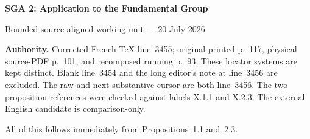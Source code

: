 \documentclass[10pt,a4paper]{article}
\begin{document}
\begin{center}
  {\Large\bfseries SGA 2: Application to the Fundamental Group}\par\smallskip
  {\large Bounded source-aligned working unit --- 20 July 2026}
\end{center}

\noindent\colorbox{softgray}{\parbox{0.95\linewidth}{\footnotesize\textbf{Authority.}
Corrected French TeX line~3455; original printed p.~117, physical source-PDF
p.~101, and recomposed running p.~93. These locator systems are kept
distinct. Blank line~3454 and the long editor's note at line~3456 are
excluded. The raw and next substantive cursor are both line~3456. The two
proposition references were checked against labels X.1.1 and X.2.3. The
external English candidate is comparison-only.}}

\medskip
\noindent All of this follows immediately from Propositions~1.1 and~2.3.
\end{document}
